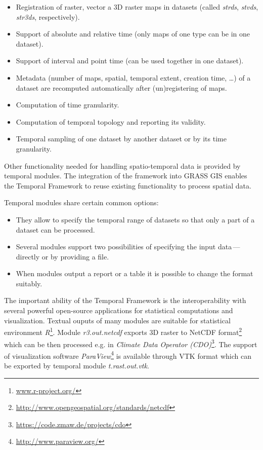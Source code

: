 \documentclass[a4paper,12pt]{book}
\newcommand{\mod}[1]{\textsl{#1}}
\newcommand{\tf}{Temporal Framework\xspace}
\begin{document}
\begin{itemize}
    \item Registration of raster, vector a 3D raster maps in datasets (called \emph{strds}, \emph{stvds}, \emph{str3ds}, respectively).
    \item Support of absolute and relative time (only maps of one type can be in one dataset).
    \item Support of interval and point time (can be used together in one dataset).
    \item Metadata (number of maps, spatial, temporal extent, creation time, \ldots) of a dataset
    are recomputed automatically after (un)registering of maps.
    \item Computation of time granularity.
    \item Computation of temporal topology and reporting its validity.
    \item Temporal sampling of one dataset by another dataset or by its time granularity.
\end{itemize}

Other functionality needed for handling spatio-temporal data is provided by temporal modules.
The integration of the framework into GRASS GIS enables the \tf to reuse existing
functionality to process spatial data.

Temporal modules share certain common options:
\begin{itemize}
  \item They allow to specify the temporal range of datasets so that only a part of a dataset can be processed.
  \item Several modules support two possibilities of specifying the input data\,---\,directly or by providing a file.
  \item When modules output a report or a table it is possible to change the format suitably.
\end{itemize}

The important ability of the \tf is the interoperability
with several powerful open-source applications for statistical computations and visualization.
Textual ouputs of many modules are suitable for statistical environment \emph{R}\footnote{\url{www.r-project.org/}}.
Module \mod{r3.out.netcdf} exports 3D raster to NetCDF
format\footnote{\url{http://www.opengeospatial.org/standards/netcdf}}
which can be then processed e.g. in \emph{Climate Data Operator (CDO)}\footnote{\url{https://code.zmaw.de/projects/cdo}}.
The support of visualization software \emph{ParaView}\footnote{\url{http://www.paraview.org/}} is available
through VTK format which can be exported by temporal module \mod{t.rast.out.vtk}.
\end{document}
